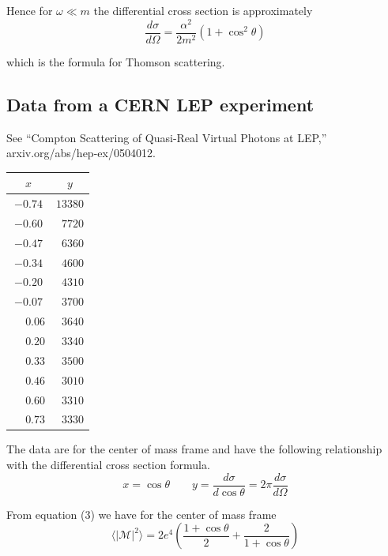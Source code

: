 \documentclass[12pt]{article}
\begin{document}
\noindent
Hence for $\omega\ll m$ the differential cross section is approximately
\begin{equation*}
\frac{d\sigma}{d\Omega}=\frac{\alpha^2}{2m^2}(1+\cos^2\theta)
\end{equation*}

\noindent
which is the formula for Thomson scattering.

\subsection*{Data from a CERN LEP experiment}
See ``Compton Scattering of Quasi-Real Virtual Photons at LEP,''
arxiv.org/abs/hep-ex/0504012.

\begin{center}
\begin{tabular}{|c|c|}
\hline
$x$ & $y$\\
\hline
$-0.74$ & $13380$\\
$-0.60$ & $\phantom{0}7720$\\
$-0.47$ & $\phantom{0}6360$\\
$-0.34$ & $\phantom{0}4600$\\
$-0.20$ & $\phantom{0}4310$\\
$-0.07$ & $\phantom{0}3700$\\
$\phantom{+}0.06$ & $\phantom{0}3640$\\
$\phantom{+}0.20$ & $\phantom{0}3340$\\
$\phantom{+}0.33$ & $\phantom{0}3500$\\
$\phantom{+}0.46$ & $\phantom{0}3010$\\
$\phantom{+}0.60$ & $\phantom{0}3310$\\
$\phantom{+}0.73$ & $\phantom{0}3330$\\
\hline
\end{tabular}
\end{center}

\noindent
The data are for the center of mass frame and have the following relationship with the differential cross section formula.
\begin{equation*}
x=\cos\theta\qquad y=\frac{d\sigma}{d\cos\theta}=2\pi\frac{d\sigma}{d\Omega}
\end{equation*}

\noindent
From equation (3) we have for the center of mass frame
\begin{equation*}
\langle|\mathcal{M}|^2\rangle
=
2e^4\left(
\frac{1+\cos\theta}{2}+\frac{2}{1+\cos\theta}
\right)
\end{equation*}
\end{document}
